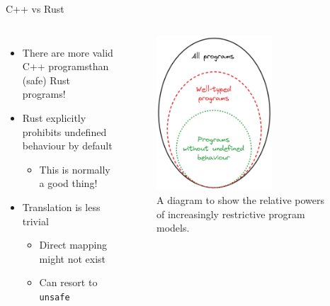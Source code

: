 \documentclass[10pt,aspectratio=169]{beamer}
\begin{document}
\begin{frame}{C++ vs Rust}
    \begin{columns}[onlytextwidth]
        \centering
            \begin{itemize}
                \item There are more valid C++ programs\newline than (safe) Rust programs!
                \item Rust explicitly prohibits undefined behaviour by default
                \begin{itemize}
                    \item This is normally a good thing!
                \end{itemize}
                \item Translation is less trivial
                \begin{itemize}
                    \item Direct mapping might not exist
                    \item Can resort to \texttt{unsafe}
                \end{itemize}
            \end{itemize}
            \begin{figure}[H]
                \includegraphics[width=0.65\textwidth]{images/excalidraw_programs_venn.png}
                \caption{A diagram to show the relative powers of increasingly restrictive program models.}
            \label{fig:warwick_mantevo_link}
        \end{figure}
    \end{columns}
\end{frame}
\end{document}
